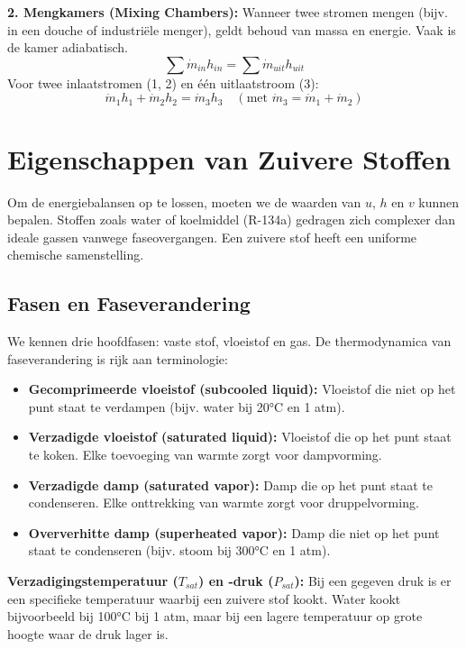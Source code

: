 \documentclass[a4paper,11pt,twoside]{report}
\begin{document}
\textbf{2. Mengkamers (Mixing Chambers):}
Wanneer twee stromen mengen (bijv. in een douche of industriële menger), geldt behoud van massa en energie. Vaak is de kamer adiabatisch.
\[
\sum \dot{m}_{in} h_{in} = \sum \dot{m}_{uit} h_{uit}
\]
Voor twee inlaatstromen (1, 2) en één uitlaatstroom (3):
\[
\dot{m}_1 h_1 + \dot{m}_2 h_2 = \dot{m}_3 h_3 \quad (\text{met } \dot{m}_3 = \dot{m}_1 + \dot{m}_2)
\]

\chapter{Eigenschappen van Zuivere Stoffen}
Om de energiebalansen op te lossen, moeten we de waarden van $u$, $h$ en $v$ kunnen bepalen. Stoffen zoals water of koelmiddel (R-134a) gedragen zich complexer dan ideale gassen vanwege faseovergangen. Een zuivere stof heeft een uniforme chemische samenstelling.

\section{Fasen en Faseverandering}
We kennen drie hoofdfasen: vaste stof, vloeistof en gas. De thermodynamica van faseverandering is rijk aan terminologie:
\begin{itemize}
    \item \textbf{Gecomprimeerde vloeistof (subcooled liquid):} Vloeistof die niet op het punt staat te verdampen (bijv. water bij 20°C en 1 atm).
    \item \textbf{Verzadigde vloeistof (saturated liquid):} Vloeistof die op het punt staat te koken. Elke toevoeging van warmte zorgt voor dampvorming.
    \item \textbf{Verzadigde damp (saturated vapor):} Damp die op het punt staat te condenseren. Elke onttrekking van warmte zorgt voor druppelvorming.
    \item \textbf{Oververhitte damp (superheated vapor):} Damp die niet op het punt staat te condenseren (bijv. stoom bij 300°C en 1 atm).
\end{itemize}
\textbf{Verzadigingstemperatuur ($T_{sat}$) en -druk ($P_{sat}$):} Bij een gegeven druk is er een specifieke temperatuur waarbij een zuivere stof kookt. Water kookt bijvoorbeeld bij 100°C bij 1 atm, maar bij een lagere temperatuur op grote hoogte waar de druk lager is.
\end{document}
